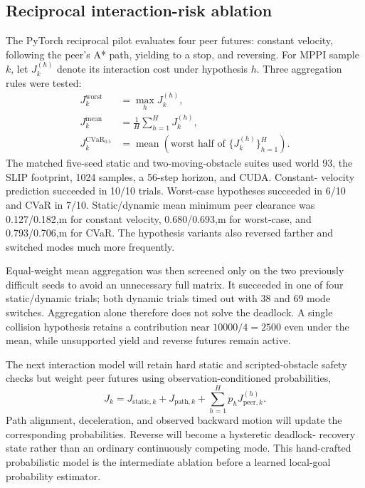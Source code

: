 \documentclass[11pt,a4paper]{article}
\begin{document}
\subsection{Reciprocal interaction-risk ablation}

The PyTorch reciprocal pilot evaluates four peer futures: constant velocity,
following the peer's A* path, yielding to a stop, and reversing. For MPPI
sample $k$, let $J_k^{(h)}$ denote its interaction cost under hypothesis $h$.
Three aggregation rules were tested:
\begin{align}
  J_k^{\mathrm{worst}} &= \max_h J_k^{(h)},\\
  J_k^{\mathrm{mean}} &= \frac{1}{H}\sum_{h=1}^{H}J_k^{(h)},\\
  J_k^{\mathrm{CVaR}_{0.5}} &=
    \operatorname{mean}\!\left(\text{worst half of }\{J_k^{(h)}\}_{h=1}^H\right).
\end{align}
The matched five-seed static and two-moving-obstacle suites used world 93,
the SLIP footprint, 1024 samples, a 56-step horizon, and CUDA. Constant-
velocity prediction succeeded in 10/10 trials. Worst-case hypotheses
succeeded in 6/10 and CVaR in 7/10. Static/dynamic mean minimum peer clearance
was 0.127/0.182,m for constant velocity, 0.680/0.693,m for worst-case, and
0.793/0.706,m for CVaR. The hypothesis variants also reversed farther and
switched modes much more frequently.

Equal-weight mean aggregation was then screened only on the two previously
difficult seeds to avoid an unnecessary full matrix. It succeeded in one of
four static/dynamic trials; both dynamic trials timed out with 38 and 69 mode
switches. Aggregation alone therefore does not solve the deadlock. A single
collision hypothesis retains a contribution near $10000/4=2500$ even under
the mean, while unsupported yield and reverse futures remain active.

The next interaction model will retain hard static and scripted-obstacle
safety checks but weight peer futures using observation-conditioned
probabilities,
\begin{equation}
  J_k = J_{\mathrm{static},k}+J_{\mathrm{path},k}
        +\sum_{h=1}^{H}p_h J_{\mathrm{peer},k}^{(h)}.
\end{equation}
Path alignment, deceleration, and observed backward motion will update the
corresponding probabilities. Reverse will become a hysteretic deadlock-
recovery state rather than an ordinary continuously competing mode. This
hand-crafted probabilistic model is the intermediate ablation before a
learned local-goal probability estimator.
\end{document}
